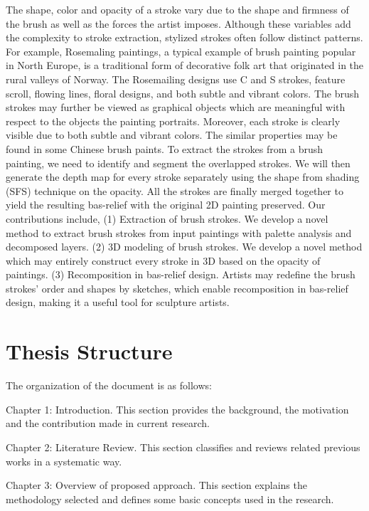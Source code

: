 The shape, color and opacity of a stroke vary due to the shape and firmness of the brush as well as the forces the artist imposes. Although these variables add the complexity to stroke extraction, stylized strokes often follow distinct patterns. For example, Rosemaling paintings, a typical example of brush painting popular in North Europe, is a traditional form of decorative folk art that originated in the rural valleys of Norway. The Rosemailing designs use C and S strokes, feature scroll, flowing lines, floral designs, and both subtle and vibrant colors. The brush strokes may further be viewed as graphical objects which are meaningful with respect to the objects the painting portraits. Moreover, each stroke is clearly visible due to both subtle and vibrant colors. The similar properties may be found in some Chinese brush paints.
To extract the strokes from a brush painting, we need to identify and segment the overlapped strokes. We will then generate the depth map for every stroke separately using the shape from shading (SFS) technique on the opacity. All the strokes are finally merged together to yield the resulting bas-relief with the original 2D painting preserved. Our contributions include,
\newline
(1) Extraction of brush strokes. We develop a novel method to extract brush strokes from input paintings with palette analysis and decomposed layers.
\newline
(2) 3D modeling of brush strokes. We develop a novel method which may entirely construct every stroke in 3D based on the opacity of paintings.
\newline
(3) Recomposition in bas-relief design. Artists may redefine the brush strokes’ order and shapes by sketches, which enable recomposition in bas-relief design, making it a useful tool for sculpture artists.



\section{Thesis Structure}

The organization of the document is as follows:

Chapter 1: Introduction. This section provides the background, the motivation and the contribution made in current research.

Chapter 2: Literature Review. This section classifies and reviews related previous works  in a systematic way.

Chapter 3: Overview of proposed approach. This section explains the methodology selected and defines some basic concepts used in the research.

